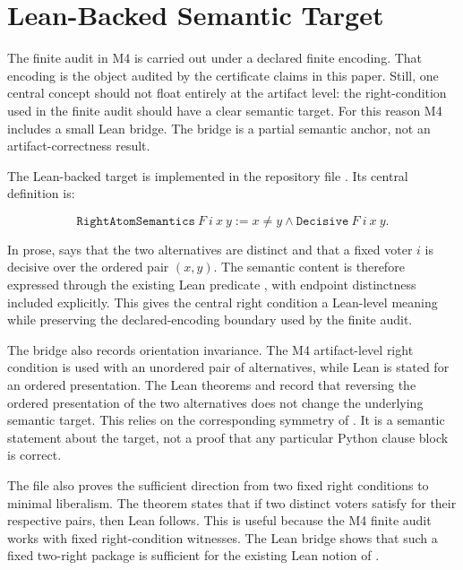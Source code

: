 \section{Lean-Backed Semantic Target}

The finite audit in M4 is carried out under a declared finite encoding. That
encoding is the object audited by the certificate claims in this paper. Still,
one central concept should not float entirely at the artifact level: the
right-condition used in the finite audit should have a clear semantic target.
For this reason M4 includes a small Lean bridge. The bridge is a partial
semantic anchor, not an artifact-correctness result.

The Lean-backed target is implemented in the repository file
. Its central definition is:

\[
\texttt{RightAtomSemantics}\ F\ i\ x\ y :=
x \ne y \land \texttt{Decisive}\ F\ i\ x\ y.
\]

In prose,  says that the two alternatives are
distinct and that a fixed voter \(i\) is decisive over the ordered pair
\((x,y)\). The semantic content is therefore expressed through the existing
Lean predicate , with endpoint distinctness included explicitly.
This gives the central right condition a Lean-level meaning while preserving
the declared-encoding boundary used by the finite audit.

The bridge also records orientation invariance. The M4 artifact-level right
condition is used with an unordered pair of alternatives, while Lean
 is stated for an ordered presentation. The Lean theorems
 and  record
that reversing the ordered presentation of the two alternatives does not
change the underlying semantic target. This relies on the corresponding
symmetry of . It is a semantic statement about the target, not a
proof that any particular Python clause block is correct.

The file also proves the sufficient direction from two fixed right conditions
to minimal liberalism. The theorem  states
that if two distinct voters satisfy  for their
respective pairs, then Lean  follows. This is useful because the
M4 finite audit works with fixed right-condition witnesses. The Lean bridge
shows that such a fixed two-right package is sufficient for the existing Lean
notion of .

